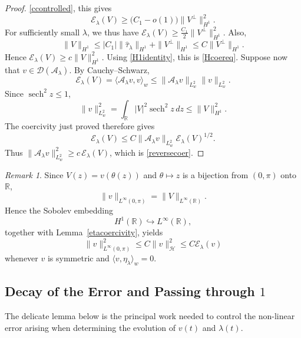 \documentclass[11pt,a4paper]{article}
\DeclareMathOperator{\sech}{sech}
\numberwithin{equation}{section}
\theoremstyle{plain}
\theoremstyle{remark}
\newtheorem{remark}[theorem]{Remark}
\begin{document}
\begin{proof}
\eqref{ccontrolled}, this gives
$$
\mathcal E_\lambda(V)
\geq
\bigl(C_1-o(1)\bigr)\|V^\perp\|_{H^1}^2.
$$
For sufficiently small $\lambda$, we thus have $\mathcal E_\lambda(V)
\geq
\frac{C_1}{2}\|V^\perp\|_{H^1}^2$. Also,
$$
\|V\|_{H^1}
\leq
|C_1|\|\widehat{\tau}_\lambda\|_{H^1}
+
\|V^\perp\|_{H^1}
\leq
C\|V^\perp\|_{H^1}.
$$
Hence $\mathcal E_\lambda(V)
\geq
c\|V\|_{H^1}^2$. Using \eqref{H1identity}, this is
\eqref{Hcoereq}.
Suppose now that $v\in\mathcal D(\mathcal A_\lambda)$. By
Cauchy--Schwarz,
$$
\mathcal E_\lambda(V)
=
\langle\mathcal A_\lambda v,v\rangle_w
\leq
\|\mathcal A_\lambda v\|_{L_w^2}
\|v\|_{L_w^2}.
$$
Since $\sech^2z\leq1$,
$$
\|v\|_{L_w^2}^2
=
\int_{\mathbb R}|V|^2\sech^2z\,dz
\leq
\|V\|_{H^1}^2.
$$
The coercivity just proved therefore gives
$$
\mathcal E_\lambda(V)
\leq
C
\|\mathcal A_\lambda v\|_{L_w^2}
\mathcal E_\lambda(V)^{1/2}.
$$
Thus $\|\mathcal A_\lambda v\|_{L_w^2}^2
\geq
c\,\mathcal E_\lambda(V)$, which is \eqref{reversecoer}.
\end{proof}

\begin{remark}
Since $V(z)=v(\theta(z))$ and $\theta\mapsto z$ is a bijection from
$(0,\pi)$ onto $\mathbb R$,
$$
\|v\|_{L^\infty(0,\pi)}
=
\|V\|_{L^\infty(\mathbb R)}.
$$
Hence the Sobolev embedding
$$
H^1(\mathbb R)\hookrightarrow L^\infty(\mathbb R),
$$
together with Lemma~\ref{etacoercivity}, yields
\begin{equation}
\|v\|_{L^\infty(0,\pi)}^2
\leq
C\|v\|_{\mathcal H}^2
\leq
C\mathcal E_\lambda(v)
\end{equation}
whenever $v$ is symmetric and
$\langle v,\eta_\lambda\rangle_w=0$. 
\end{remark}



\subsection{Decay of the Error and Passing through $1$}
The delicate lemma below is the principal work needed to control the non-linear error arising when determining the evolution of $v(t)$ and $\lambda(t)$.
\end{document}
